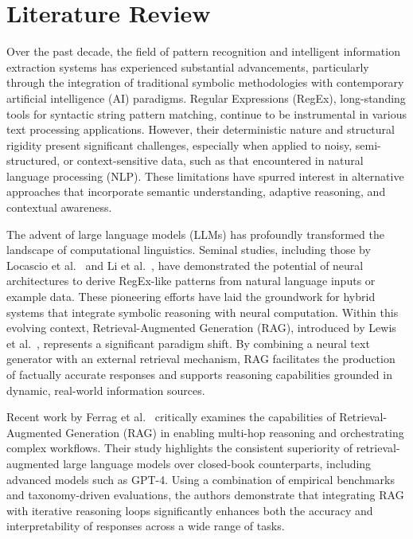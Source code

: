 

\chapter{Literature Review}

Over the past decade, the field of pattern recognition and intelligent information extraction systems has experienced substantial advancements, particularly through the integration of traditional symbolic methodologies with contemporary artificial intelligence (AI) paradigms. Regular Expressions (RegEx), long-standing tools for syntactic string pattern matching, continue to be instrumental in various text processing applications. However, their deterministic nature and structural rigidity present significant challenges, especially when applied to noisy, semi-structured, or context-sensitive data, such as that encountered in natural language processing (NLP). These limitations have spurred interest in alternative approaches that incorporate semantic understanding, adaptive reasoning, and contextual awareness.

\vspace{0.5cm}

The advent of large language models (LLMs) has profoundly transformed the landscape of computational linguistics. Seminal studies, including those by Locascio et al.~\cite{locascio2016neural} and Li et al.~\cite{li2020transregex}, have demonstrated the potential of neural architectures to derive RegEx-like patterns from natural language inputs or example data. These pioneering efforts have laid the groundwork for hybrid systems that integrate symbolic reasoning with neural computation. Within this evolving context, Retrieval-Augmented Generation (RAG), introduced by Lewis et al.~\cite{lewis2020retrieval}, represents a significant paradigm shift. By combining a neural text generator with an external retrieval mechanism, RAG facilitates the production of factually accurate responses and supports reasoning capabilities grounded in dynamic, real-world information sources.

\vspace{0.5cm}

Recent work by Ferrag et al.~\cite{ferrag2025can} critically examines the capabilities of Retrieval-Augmented Generation (RAG) in enabling multi-hop reasoning and orchestrating complex workflows. Their study highlights the consistent superiority of retrieval-augmented large language models over closed-book counterparts, including advanced models such as GPT-4. Using a combination of empirical benchmarks and taxonomy-driven evaluations, the authors demonstrate that integrating RAG with iterative reasoning loops significantly enhances both the accuracy and interpretability of responses across a wide range of tasks.

